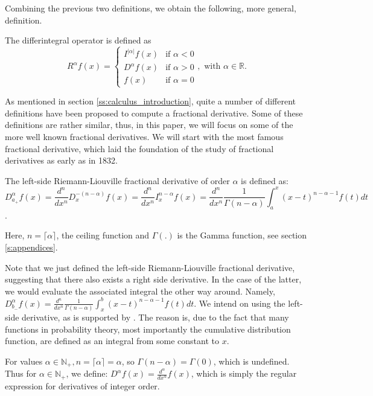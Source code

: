 Combining the previous two definitions, we obtain the following, more general, definition.
\begin{definition}\label{d: differintegral}
    The differintegral operator is defined as
    \begin{equation}
        R^\alpha f(x) = \begin{cases}
            I^{|\alpha|} f(x) & \text{if } \alpha < 0 \\
            D^\alpha f(x) & \text{if } \alpha > 0 \\
            f(x) & \text{if } \alpha = 0
        \end{cases}, \text{ with } \alpha \in \mathbb{R}.
        \end{equation}
\end{definition}

As mentioned in section \ref{ss:calculus_introduction}, quite a number of different definitions have been proposed to compute a fractional derivative. Some of these definitions are rather similar, thus, in this paper, we will focus on some of the more well known fractional derivatives. We will start with the most famous fractional derivative, which laid the foundation of the study of fractional derivatives as early as in 1832.
\begin{definition}
    The left-side Riemann-Liouville fractional derivative of order \(\alpha\) is defined as:
    \begin{equation}
        D^{\alpha}_{a_+} f(x) =  \frac{d^{n}}{dx^{n}} D_{x}^{-(n - \alpha)} f(x) = \frac{d^{n}}{dx^{n}} I_{x}^{n - \alpha} f(x) = \frac{d^n}{dx^n} \frac{1}{\Gamma(n -\alpha)}  \int_{a}^{x} (x-t)^{n - \alpha-1} f(t) dt
    \end{equation} \cite{liouville1832}.

    Here, \(n = \lceil \alpha \rceil\), the ceiling function and \(\Gamma(.)\) is the Gamma function, see section \autoref{s:appendices}.

    Note that we just defined the left-side Riemann-Liouville fractional derivative, suggesting that there also exists a right side derivative. In the case of the latter, we would evaluate the associated integral the other way around. Namely, \(D^{\alpha}_{b_-} f(x) = \frac{d^n}{dx^n} \frac{1}{\Gamma(n -\alpha)}  \int_{x}^{b} (x-t)^{n - \alpha-1} f(t) dt\). We intend on using the left-side derivative, as is supported by \cite{tarasov2023}. The reason is, due to the fact that many functions in probability theory, most importantly the cumulative distribution function, are defined as an integral from some constant to \(x\). 
    
    \begin{remark}\label{r: integer}
        For values \(\alpha \in \mathbb{N}_+, n =  \lceil \alpha \rceil = \alpha\), so \(\Gamma(n - \alpha) = \Gamma(0)\), which is undefined. Thus for \(\alpha \in \mathbb{N}_+\), we define: \(D^\alpha f(x) = \frac{d^\alpha}{dx^\alpha} f(x)\), which is simply the regular expression for derivatives of integer order.
    \end{remark}
   
\end{definition}
